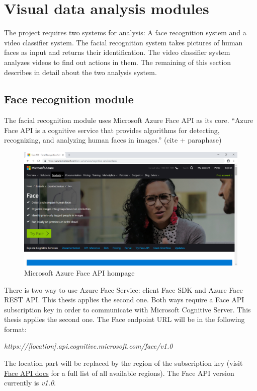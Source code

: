 \section{Visual data analysis modules}
The project requires two systems for analysis: A face recognition system and a video classifier system. The facial recognition system takes pictures of human faces as input and returns their identification. The video classifier system analyzes videos to find out actions in them. The remaining of this section describes in detail about the two analysis system.
\subsection{Face recognition module}
The facial recognition module uses Microsoft Azure Face API as its core. “Azure Face API is a cognitive service that provides algorithms for detecting, recognizing, and analyzing human faces in images.” (cite + paraphase)
\begin{center}
    \begin{figure}[H]
    \centering
    \includegraphics[width=1\columnwidth]{images/chap4/face-api-homepage.PNG}
    \caption{Microsoft Azure Face API hompage}
    \end{figure}
\end{center}
There is two way to use Azure Face Service: client Face SDK and Azure Face REST API. This thesis applies the second one. Both ways require a Face API subscription key in order to communicate with Microsoft Cognitive Server. This thesis applies the second one. The Face endpoint URL will be in the following format:
\begin{center}
\textit{https://[location].api.cognitive.microsoft.com/face/v1.0}
\end{center}
The location part will be replaced by the region of the subscription key (visit \href{https://westus.dev.cognitive.microsoft.com/docs/services/563879b61984550e40cbbe8d/operations/563879b61984550f30395236}{Face API docs} for a full list of all available regions). The Face API version currently is \textit{v1.0}.
